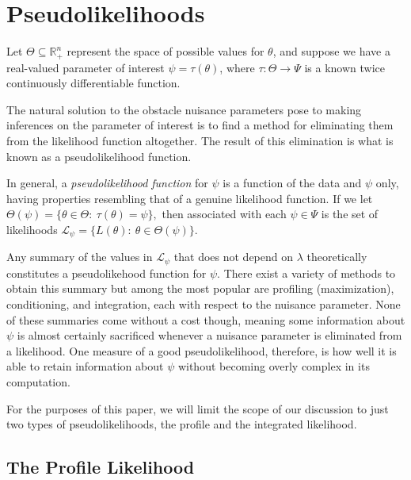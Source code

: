 \documentclass[
  12pt]{article}
\begin{document}
\section{Pseudolikelihoods}\label{pseudolikelihoods}

Let \(\Theta \subseteq \mathbb{R}^n_+\) represent the space of possible
values for \(\theta\), and suppose we have a real-valued parameter of
interest \(\psi = \tau(\theta)\), where \(\tau: \Theta \to \Psi\) is a
known twice continuously differentiable function.

The natural solution to the obstacle nuisance parameters pose to making
inferences on the parameter of interest is to find a method for
eliminating them from the likelihood function altogether. The result of
this elimination is what is known as a pseudolikelihood function.

In general, a \emph{pseudolikelihood function} for \(\psi\) is a
function of the data and \(\psi\) only, having properties resembling
that of a genuine likelihood function. If we let
\(\Theta(\psi) = \{\theta \in \Theta: \> \tau(\theta) = \psi \},\) then
associated with each \(\psi \in \Psi\) is the set of likelihoods
\(\mathcal{L}_{\psi} = \{L(\theta): \> \theta \in \Theta(\psi)\}.\)

Any summary of the values in \(\mathcal{L}_{\psi}\) that does not depend
on \(\lambda\) theoretically constitutes a pseudolikehood function for
\(\psi\). There exist a variety of methods to obtain this summary but
among the most popular are profiling (maximization), conditioning, and
integration, each with respect to the nuisance parameter. None of these
summaries come without a cost though, meaning some information about
\(\psi\) is almost certainly sacrificed whenever a nuisance parameter is
eliminated from a likelihood. One measure of a good pseudolikelihood,
therefore, is how well it is able to retain information about \(\psi\)
without becoming overly complex in its computation.

For the purposes of this paper, we will limit the scope of our
discussion to just two types of pseudolikelihoods, the profile and the
integrated likelihood.

\subsection{The Profile Likelihood}\label{the-profile-likelihood}
\end{document}
